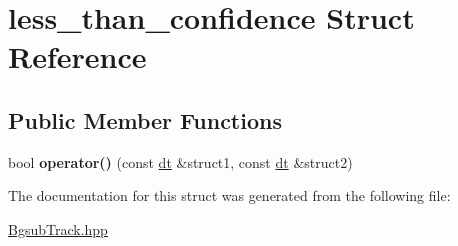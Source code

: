 \hypertarget{structless__than__confidence}{}\section{less\+\_\+than\+\_\+confidence Struct Reference}
\label{structless__than__confidence}
\subsection*{Public Member Functions}
\begin{DoxyCompactItemize}
\item 
bool {\bfseries operator()} (const \hyperlink{structdt}{dt} \&struct1, const \hyperlink{structdt}{dt} \&struct2)\hypertarget{structless__than__confidence_a991231df4d5bc8db7a19872eeed33f7f}{}\label{structless__than__confidence_a991231df4d5bc8db7a19872eeed33f7f}

\end{DoxyCompactItemize}


The documentation for this struct was generated from the following file\+:\begin{DoxyCompactItemize}
\item 
\hyperlink{BgsubTrack_8hpp}{Bgsub\+Track.\+hpp}\end{DoxyCompactItemize}
